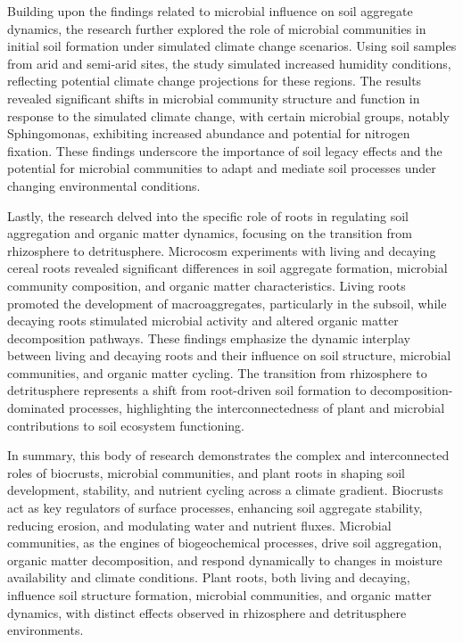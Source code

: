 Building upon the findings related to microbial influence on soil aggregate dynamics, the research further explored the role of microbial communities in initial soil formation under simulated climate change scenarios. Using soil samples from arid and semi-arid sites, the study simulated increased humidity conditions, reflecting potential climate change projections for these regions. The results revealed significant shifts in microbial community structure and function in response to the simulated climate change, with certain microbial groups, notably Sphingomonas, exhibiting increased abundance and potential for nitrogen fixation. These findings underscore the importance of soil legacy effects and the potential for microbial communities to adapt and mediate soil processes under changing environmental conditions.

Lastly, the research delved into the specific role of roots in regulating soil aggregation and organic matter dynamics, focusing on the transition from rhizosphere to detritusphere. Microcosm experiments with living and decaying cereal roots revealed significant differences in soil aggregate formation, microbial community composition, and organic matter characteristics. Living roots promoted the development of macroaggregates, particularly in the subsoil, while decaying roots stimulated microbial activity and altered organic matter decomposition pathways. These findings emphasize the dynamic interplay between living and decaying roots and their influence on soil structure, microbial communities, and organic matter cycling. The transition from rhizosphere to detritusphere represents a shift from root-driven soil formation to decomposition-dominated processes, highlighting the interconnectedness of plant and microbial contributions to soil ecosystem functioning.

In summary, this body of research demonstrates the complex and interconnected roles of biocrusts, microbial communities, and plant roots in shaping soil development, stability, and nutrient cycling across a climate gradient. Biocrusts act as key regulators of surface processes, enhancing soil aggregate stability, reducing erosion, and modulating water and nutrient fluxes. Microbial communities, as the engines of biogeochemical processes, drive soil aggregation, organic matter decomposition, and respond dynamically to changes in moisture availability and climate conditions. Plant roots, both living and decaying, influence soil structure formation, microbial communities, and organic matter dynamics, with distinct effects observed in rhizosphere and detritusphere environments.


